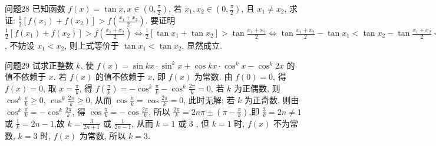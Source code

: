 问题28 已知函数 $f(x)=\tan x, x \in\left(0, \frac{\pi}{2}\right)$, 若 $x_1, x_2 \in\left(0, \frac{\pi}{2}\right)$, 且 $x_1 \neq x_2$, 求证: $\frac{1}{2}\left[f\left(x_1\right)+f\left(x_2\right)\right]>f\left(\frac{x_1+x_2}{2}\right)$.
要证明 $\frac{1}{2}\left[f\left(x_1\right)+f\left(x_2\right)\right]>f\left(\frac{x_1+x_2}{2}\right) \Leftrightarrow \frac{1}{2}\left[\tan x_1+\tan x_2\right]> \tan \frac{x_1+x_2}{2} \Leftrightarrow \tan \frac{x_1+x_2}{2}-\tan x_1<\tan x_2-\tan \frac{x_1+x_2}{2} \Leftrightarrow \tan \frac{x_2-x_1}{2}\left(1+\tan \frac{x_1+x_2}{2} \cdot \tan x_1\right)<\tan \frac{x_2-x_1}{2} \cdot\left(1+\tan \frac{x_1+x_2}{2} \cdot \tan x_2\right)$, 不妨设 $x_1<x_2$, 则上式等价于 $\tan x_1<\tan x_2$. 显然成立.



问题29 试求正整数 $k$, 使 $f(x)=\sin k x \cdot \sin ^k x+\cos k x \cdot \cos ^k x-\cos ^k 2 x$ 的值不依赖于 $x$.
若 $f(x)$ 的值不依赖于 $x$, 即 $f(x)$ 为常数.
由 $f(0)=0$, 得 $f(x)=0$, 取 $x=\frac{\pi}{k}$, 得 $f\left(\frac{\pi}{k}\right)=-\cos ^k \frac{\pi}{k}-\cos ^k \frac{2 \pi}{k}=0$, 若 $k$ 为正偶数, 则 $\cos ^k \frac{\pi}{k} \geqslant 0$, $\cos ^k \frac{2 \pi}{k} \geqslant 0$, 从而 $\cos \frac{\pi}{k}=\cos \frac{2 \pi}{k}=0$, 此时无解; 若 $k$ 为正奇数, 则由 $\cos ^k \frac{\pi}{k}= -\cos ^k \frac{2 \pi}{k}$, 得 $\cos \frac{\pi}{k}=-\cos \frac{2 \pi}{k}$, 所以 $\frac{2 \pi}{k}=2 n \pi \pm\left(\pi-\frac{\pi}{k}\right)$,即 $\frac{3}{k}=2 n \neq 1$ 或 $\frac{1}{k}=2 n-1$,故 $k=\frac{3}{2 n+1}$ 或 $\frac{1}{2 n-1}$, 从而 $k=1$ 或 3 , 但 $k=1$ 时, $f(x)$ 不为常数, $k=3$ 时, $f(x)$ 为常数, 所以 $k=3$.


